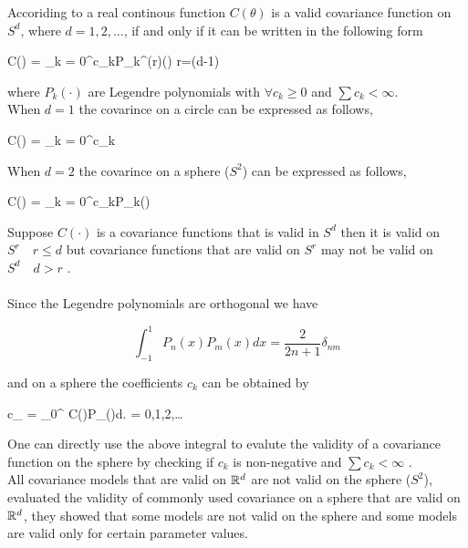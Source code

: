 Accoriding to \cite{schoenberg1942} a real continous function $C(\theta)$ is a valid covariance function on $S^d$, where $d=1,2,\ldots$, if and only if it can be written in the following form

\beq
C(\theta) = \sum_{k = 0}^\infty c_kP_k^{(r)}(\cos\theta) \quad r=(d-1)
\eeq

where $P_{k}(\cdot)$ are Legendre polynomials with $\forall c_k\ge 0$ and $\sum c_k < \infty$. \\

When $d=1$ the covarince on a circle can be expressed as follows,

\beq
C(\theta) = \sum_{k = 0}^\infty c_k\cos\theta
\eeq

When $d=2$ the covarince on a sphere ($S^2$) can be expressed as follows,

\beq \label{covs2_sum}
C(\theta) = \sum_{k = 0}^\infty c_kP_k(\cos\theta)
\eeq

Suppose $C(\cdot)$ is a covariance functions that is valid in $S^d$ then it is valid on $S^r\quad r\le d$ but covariance functions that are valid on $S^r$  may not be valid on $S^d \quad d>r$ .\\

\\

Since the Legendre polynomials are orthogonal we have

\[
	\int_{-1}^{1} P_{n}(x)P_{m}(x)dx = \frac{2}{2n+1}\delta_{nm}
\]

and on a sphere the coefficients $c_k$ can be obtained by

\beq \label{covs2_coef}
c_{\nu} = \int_0^{\pi} C(\theta)P_{\nu}(\cos\theta)d\theta. \quad \nu = 0,1,2,\ldots
\eeq

One can directly use the above integral to evalute the validity of a covariance function on the sphere by checking if $c_k$ is non-negative and $\sum c_k < \infty$ .\\ 

All covariance models that are valid on $\mathbb{R}^d$ are not valid on the sphere ($S^2$), \cite{HuangZhangRobeson2011} evaluated the validity of commonly used covariance on a sphere that are valid on $\mathbb{R}^d$, they showed that some models are not valid on the sphere and some models are valid only for certain parameter values.  
 

